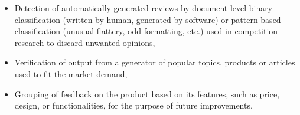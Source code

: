 \begin{itemize}
\item Detection of automatically-generated reviews by document-level binary classification (written by human, generated by software) or pattern-based classification (unusual flattery, odd formatting, etc.) used in competition research to discard unwanted opinions,
\item Verification of output from a generator of popular topics, products or articles used to fit the market demand,
\item Grouping of feedback on the product based on its features, such as price, design, or functionalities, for the purpose of future improvements.
\end{itemize}













